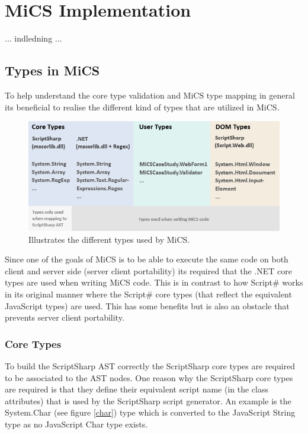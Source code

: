 \chapter{MiCS Implementation}
	... indledning ...


\section{Types in MiCS} %
\label{sec:types_in_mics}
	To help understand the core type validation and MiCS type mapping in general its beneficial to realise the different kind of types that are utilized in MiCS.

	\begin{figure}[H]
		\begin{center}
			\centerline{\includegraphics[width=16cm]{resources/images/TypesOverview.png}}
		\end{center}
		\caption{Illustrates the different types used by MiCS.}
		\label{typesOverview}
	\end{figure}

	Since one of the goals of MiCS is to be able to execute the same code on both client and server side (server client portability) its required that the .NET core types are used when writing MiCS code. This is in contrast to how Script\# works in its original manner where the Script\# core types (that reflect the equivalent JavaScript types) are used. This has some benefits but is also an obstacle that prevents server client portability.

	\subsection{Core Types} %
	\label{sub:core_types}
		To build the ScriptSharp AST correctly the ScriptSharp core types are required to be associated to the AST nodes. One reason why the ScriptSharp core types are required is that they define their equivalent script name (in the class attributes) that is used by the ScriptSharp script generator. An example is the System.Char (see figure \ref{char}) type which is converted to the JavaScript String type as no JavaScript Char type exists.

